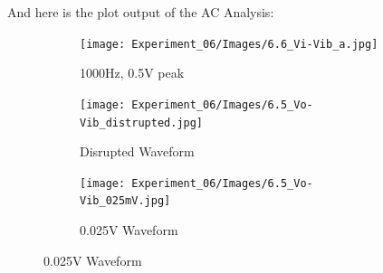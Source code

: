     And here is the plot output of the AC Analysis:
    \begin{figure}[H]
        \centering
        \begin{subfigure}{0.25\textwidth}
            \centering
            \texttt{[image: Experiment\_06/Images/6.6\_Vi-Vib\_a.jpg]}
            \caption{1000Hz, 0.5V peak}
            \label{l6acvg}
        \end{subfigure}
        \begin{subfigure}{0.25\textwidth}
            \centering
            \texttt{[image: Experiment\_06/Images/6.5\_Vo-Vib\_distrupted.jpg]}
            \caption{Disrupted Waveform}
            \label{l6dcdisrupted}
        \end{subfigure}
        \begin{subfigure}{0.25\textwidth}
            \centering
            \texttt{[image: Experiment\_06/Images/6.5\_Vo-Vib\_025mV.jpg]}
            \caption{0.025V Waveform}
            \label{l6dc025}
        \end{subfigure}


\end{figure}
